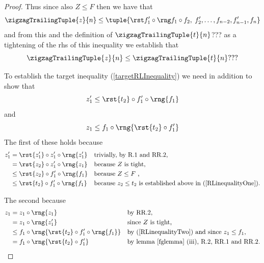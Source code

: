 \begin{proof}
Thus since also $Z \leq F$ then we have that
\[
\zigzagTrailingTuple{z}{n} \leq \tuple{\tightTail}
\] 
and from this and the definition of $\zigzagTrailingTuple{t}{n}$???
as a tightening of the rhs of this inequality we establish that
\[
\label{RLinequalityOne}
\zigzagTrailingTuple{z}{n} \leq \zigzagTrailingTuple{t}{n} ???
\]

To establish the target inequality (\ref{targetRLInequality})
we need 
in addition to show that
 \begin{equation}
 \label{RLinequalityTwo}
 z'_1 \leq  \rst{t_2} \circ f'_1 \circ \rng{f_1}
 \end{equation}
 and
  \begin{equation}
 \label{RLinequalityThree}
 z_1 \leq f_1 \circ \rng{\rst{t_2} \circ f'_1}
 \end{equation}
The first of these holds because
\begin{align*}
z'_1 &= \rst{z'_1} \circ z'_1  \circ \rng{z'_1} 
                && \mbox{trivially, by R.1 and RR.2,}\\
         &= \rst{z_2} \circ z'_1  \circ \rng{z_1} 
         &&\mbox{because $Z$ is tight,}\\
         &\leq \rst{z_2} \circ f'_1  \circ \rng{f_1}
         &&\mbox{because $Z \leq F$ ,}\\
         &\leq \rst{t_2} \circ f'_1  \circ \rng{f_1}
         &&\mbox{because $z_2 \leq t_2$ is established
                               above in (\ref{RLinequalityOne}).}
\end{align*}

The second because
\begin{align*}
z_1 &= z_1 \circ \rng{z_1}
        && \mbox{by RR.2,} \\ 
    &= z_1 \circ \rng{z'_1}
        && \mbox{since $Z$ is tight,} \\ 
    &\leq f_1 \circ \rng{\rst{t_2} \circ f'_1 \circ \rng{f_1}}
        && \mbox{by (\ref{RLinequalityTwo}) and since $z_1 \leq f_1$,} \\ 
    &= f_1 \circ \rng{\rst{t_2} \circ f'_1}
        && \mbox{by lemma \ref{fglemma} (iii), R.2, RR.1  and RR.2.}
\end{align*}
\end{proof} %

